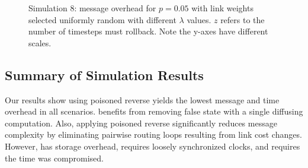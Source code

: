 \begin{figure}
\centering
{}
\caption{Simulation 8: message overhead for $p=0.05$ \er with link weights selected uniformly random with different $\lambda$ values. $z$ refers to the number of timesteps \cpr must 
rollback. Note the y-axes have different scales.}
\label{fig:lc-fixk}
\end{figure} 


\subsection{Summary of Simulation Results}
\label{subsec:discuss}


Our results show \cpr using poisoned reverse yields the lowest message and time overhead in all scenarios. \cpr benefits from removing false state with a single
diffusing computation. Also, applying poisoned reverse significantly reduces \cpr message complexity by eliminating pairwise routing loops resulting from
link cost changes. However, \cpr has storage overhead, requires loosely synchronized clocks, and requires the time \bad was compromised.

